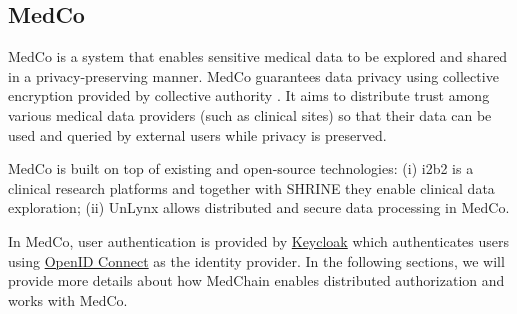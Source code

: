 
\subsection{MedCo}\label{background:medco}

MedCo \cite{raisaro2018medco} is a system that enables sensitive medical data to be explored and shared in a  privacy-preserving manner. MedCo guarantees data privacy using collective encryption provided by collective authority \cite{syta2015certificate}. It aims to distribute trust among various medical data providers (such as clinical sites) so that their data can be used and queried by external users while privacy is preserved. 

MedCo is built on top of existing and open-source technologies: (i) i2b2 \cite{murphy2010serving} is a clinical research platforms and together with SHRINE \cite{weber2009shared} they enable clinical data exploration; (ii) UnLynx \cite{froelicher2017unlynx} allows distributed and secure data processing in MedCo. 

In MedCo, user authentication is provided by \href{https://www.keycloak.org/about}{Keycloak} which authenticates users using \href{https://openid.net/connect/}{OpenID Connect} as the identity provider. In the following sections, we will provide more details about how MedChain enables distributed authorization and works with MedCo. 
